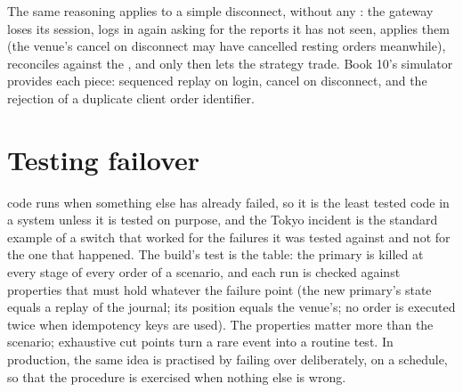 \begin{omfigure}

\label{fig:ll:resilience:window}
\end{omfigure}

The same reasoning applies to a simple disconnect, without any : the gateway loses its session, logs in again asking
for the reports it has not seen, applies them (the venue's cancel on disconnect may have cancelled resting orders meanwhile),
reconciles against the , and only then lets the strategy trade. Book 10's simulator provides each piece: sequenced
replay on login, cancel on disconnect, and the rejection of a duplicate client order identifier.

\section{Testing failover}

 code runs when something else has already failed, so it is the least tested code in a system unless it is tested on
purpose, and the Tokyo incident is the standard example of a switch that worked for the failures it was tested against and not
for the one that happened. The build's test is the table: the primary is killed at every stage of every order of a scenario,
and each run is checked against properties that must hold whatever the failure point (the new primary's state equals a replay
of the journal; its position equals the venue's; no order is executed twice when idempotency keys are used). The properties
matter more than the scenario; exhaustive cut points turn a rare event into a routine test. In production, the same idea is
practised by failing over deliberately, on a schedule, so that the procedure is exercised when nothing else is wrong.

